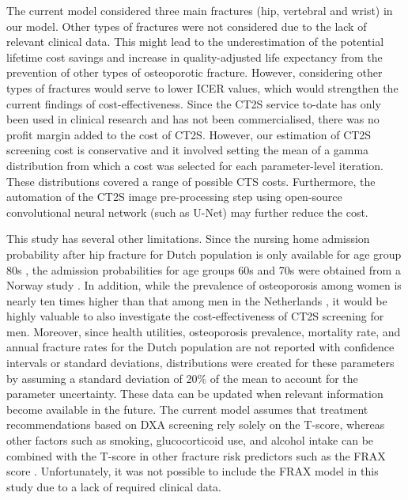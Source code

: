 The current model considered three main fractures (hip, vertebral and wrist) in our model. Other types of fractures were not considered due to the lack of relevant clinical data. This might lead to the underestimation of the potential lifetime cost savings and increase in quality-adjusted life expectancy from the prevention of other types of osteoporotic fracture. However, considering other types of fractures would serve to lower ICER values, which would strengthen the current findings of cost-effectiveness. Since the CT2S service to-date has only been used in clinical research and has not been commercialised, there was no profit margin added to the cost of CT2S. However, our estimation of CT2S screening cost is conservative and it involved setting the mean of a gamma distribution from which a cost was selected for each parameter-level iteration. These distributions covered a range of possible CTS costs. Furthermore, the automation of the CT2S image pre-processing step using open-source convolutional neural network (such as U-Net) may further reduce the cost. 

This study has several other limitations. Since the nursing home admission probability after hip fracture for Dutch population is only available for age group 80s \cite{4-69}, the admission probabilities for age groups 60s and 70s were obtained from a Norway study \cite{4-68}. In addition, while the prevalence of osteoporosis among women is nearly ten times higher than that among men in the Netherlands \cite{4-29}, it would be highly valuable to also investigate the cost-effectiveness of CT2S screening for men. Moreover, since health utilities, osteoporosis prevalence, mortality rate, and annual fracture rates for the Dutch population are not reported with confidence intervals or standard deviations, distributions were created for these parameters by assuming a standard deviation of 20\% of the mean to account for the parameter uncertainty. These data can be updated when relevant information become available in the future. The current model assumes that treatment recommendations based on DXA screening rely solely on the T-score, whereas other factors such as smoking, glucocorticoid use, and alcohol intake can be combined with the T-score in other fracture risk predictors such as the FRAX score \cite{4-81}. Unfortunately, it was not possible to include the FRAX model in this study due to a lack of required clinical data.

